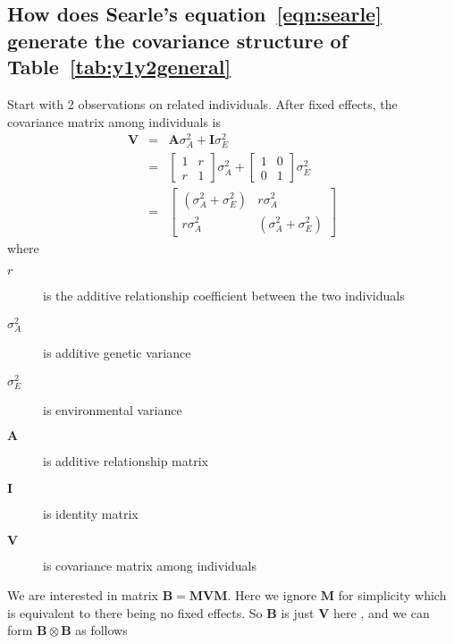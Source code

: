 \documentclass[titlepage,a4paper,12pt]{article}  %
\begin{document}
\subsection{How does Searle's equation~\ref{eqn:searle} generate the covariance structure of Table~\ref{tab:y1y2general}}
  Start with 2 observations on related individuals. After fixed effects, the covariance matrix among individuals is 
\begin{eqnarray}
  \bm{V} & = & \bm{A} \sigma^{2}_{A} + \bm{I} \sigma^{2}_{E} \\
    & = &  \begin{bmatrix} 1 & r \\ r & 1 \end{bmatrix} \sigma^{2}_{A} 
         +  \begin{bmatrix} 1 & 0 \\ 0 & 1 \end{bmatrix} \sigma^{2}_{E} \\ \label{eqn:regv}
    & = & \begin{bmatrix} (\sigma^{2}_{A} + \sigma^{2}_{E}) & r \sigma^{2}_{A} \\ r \sigma^{2}_{A} & (\sigma^{2}_{A} + \sigma^{2}_{E}) \end{bmatrix}
\end{eqnarray}
 where
\begin{description}
\item[$r$] is the additive relationship coefficient between the two individuals
\item[$\sigma^{2}_{A}$] is additive genetic variance
\item[$\sigma^{2}_{E}$] is environmental variance
\item[$\bm{A}$] is additive relationship matrix
\item[$\bm{I}$] is identity matrix 
\item[$\bm{V}$] is covariance matrix among individuals
\end{description}

We are interested in matrix $\bm{B} = \bm{M} \bm{V} \bm{M}$. Here we  ignore $\bm{M}$ for simplicity which is equivalent to there being no fixed effects.  So $\bm{B}$  is just $\bm{V}$ here , and we can form $\bm{B} \otimes \bm{B}$ as follows
\end{document}
